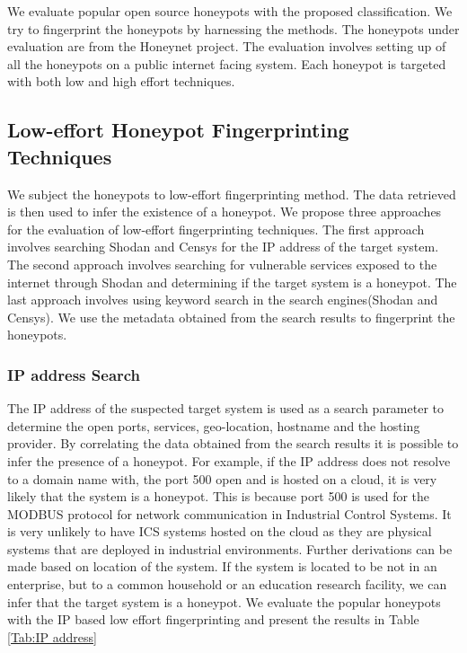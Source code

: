 \documentclass[../main.tex]{subfiles}
\begin{document}
We evaluate popular open source honeypots with the proposed classification. We try to fingerprint the honeypots by harnessing the methods. The honeypots under evaluation are from the Honeynet project. The evaluation involves setting up of all the honeypots on a public internet facing system. Each honeypot is targeted with both low and high effort techniques. 
 
\subsection{Low-effort Honeypot Fingerprinting Techniques}
 We subject the honeypots to low-effort fingerprinting method. The data retrieved is then used to infer the existence of a honeypot. We propose three approaches for the evaluation of low-effort fingerprinting techniques. The first approach involves searching Shodan and Censys for the IP address of the target system. The second approach involves searching for vulnerable services exposed to the internet through Shodan and determining if the target system is a honeypot. The last approach involves using keyword search in the search engines(Shodan and Censys). We use the metadata obtained from the search results to fingerprint the honeypots. 
 
 \subsubsection{IP address Search}
The IP address of the suspected target system is used as a search parameter to determine the open ports, services, geo-location, hostname and the hosting provider. By correlating the data obtained from the search results it is possible to infer the presence of a honeypot. For example, if the IP address does not resolve to a domain name with, the port 500 open and is hosted on a cloud, it is very likely that the system is a honeypot. This is because port 500 is used for the MODBUS protocol for network communication in Industrial Control Systems. It is very unlikely to have ICS systems hosted on the cloud as they are physical systems that are deployed in industrial environments.  Further derivations can be made based on location of the system. If the system is located to be not in an enterprise, but to a common household or an education research facility, we can infer that the target system is a honeypot. We  evaluate the popular honeypots with the IP based low effort fingerprinting and present the results in Table \ref{Tab:IP address}
\end{document}
